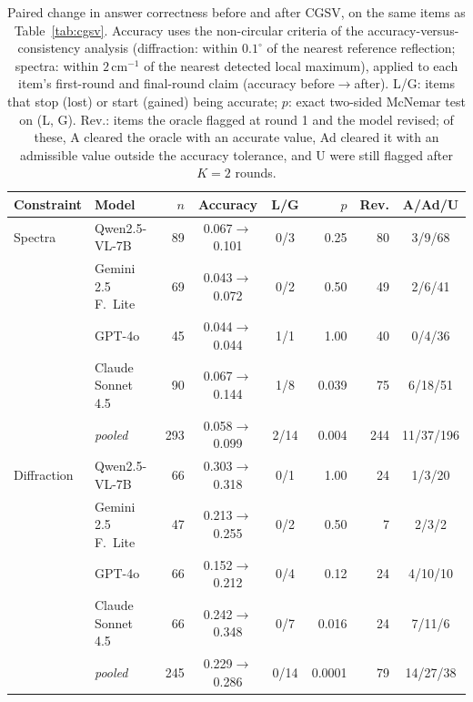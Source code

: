 \documentclass[pdflatex,sn-nature]{sn-jnl}
\newcommand{\revon}{}
\newcommand{\revon}{\color{blue}}%
\begin{document}
\begin{table}[t]
\revon\centering
\caption{\justifying Paired change in answer correctness before and after CGSV, on the same items as
Table~\ref{tab:cgsv}. Accuracy uses the non-circular criteria of the accuracy-versus-consistency
analysis (diffraction: within $0.1^\circ$ of the nearest reference reflection; spectra: within
$2\,\mathrm{cm}^{-1}$ of the nearest detected local maximum), applied to each item's first-round
and final-round claim (accuracy before$\to$after). L/G: items that stop (lost) or start (gained) being
accurate; $p$: exact two-sided McNemar test on (L, G). Rev.: items the oracle flagged at round 1 and the
model revised; of these, A cleared the oracle with an accurate value, Ad cleared it with an admissible
value outside the accuracy tolerance, and U were still flagged after $K=2$ rounds.}
\label{tab:cgsvacc}
{\scriptsize\setlength{\tabcolsep}{2.5pt}\renewcommand{\arraystretch}{1.12}
\begin{tabular}{l l r c c r r c}
\toprule
Constraint & Model & $n$ & Accuracy & L/G & $p$ & Rev. & A/Ad/U \\
\midrule
Spectra & Qwen2.5-VL-7B & 89 & 0.067$\to$0.101 & 0/3 & 0.25 & 80 & 3/9/68 \\
 & Gemini 2.5 F.\ Lite & 69 & 0.043$\to$0.072 & 0/2 & 0.50 & 49 & 2/6/41 \\
 & GPT-4o & 45 & 0.044$\to$0.044 & 1/1 & 1.00 & 40 & 0/4/36 \\
 & Claude Sonnet 4.5 & 90 & 0.067$\to$0.144 & 1/8 & 0.039 & 75 & 6/18/51 \\
 & \textit{pooled} & 293 & 0.058$\to$0.099 & 2/14 & 0.004 & 244 & 11/37/196 \\
\addlinespace
Diffraction & Qwen2.5-VL-7B & 66 & 0.303$\to$0.318 & 0/1 & 1.00 & 24 & 1/3/20 \\
 & Gemini 2.5 F.\ Lite & 47 & 0.213$\to$0.255 & 0/2 & 0.50 & 7 & 2/3/2 \\
 & GPT-4o & 66 & 0.152$\to$0.212 & 0/4 & 0.12 & 24 & 4/10/10 \\
 & Claude Sonnet 4.5 & 66 & 0.242$\to$0.348 & 0/7 & 0.016 & 24 & 7/11/6 \\
 & \textit{pooled} & 245 & 0.229$\to$0.286 & 0/14 & 0.0001 & 79 & 14/27/38 \\
\bottomrule
\end{tabular}}
\end{table}
\end{document}
